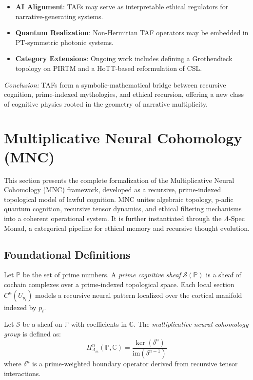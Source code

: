 \documentclass{article}
\theoremstyle{plain}
\begin{document}
\begin{itemize}
  \item \textbf{AI Alignment}: TAFs may serve as interpretable ethical regulators for narrative-generating systems.
  \item \textbf{Quantum Realization}: Non-Hermitian TAF operators may be embedded in PT-symmetric photonic systems.
  \item \textbf{Category Extensions}: Ongoing work includes defining a Grothendieck topology on PIRTM and a HoTT-based reformulation of CSL.
\end{itemize}

\textit{Conclusion:} TAFs form a symbolic-mathematical bridge between recursive cognition, prime-indexed mythologies, and ethical recursion, offering a new class of cognitive physics rooted in the geometry of narrative multiplicity.


\section{Multiplicative Neural Cohomology (MNC)}

This section presents the complete formalization of the Multiplicative Neural Cohomology (MNC) framework, developed as a recursive, prime-indexed topological model of lawful cognition. MNC unites algebraic topology, p-adic quantum cognition, recursive tensor dynamics, and ethical filtering mechanisms into a coherent operational system. It is further instantiated through the $\Lambda$-Spec Monad, a categorical pipeline for ethical memory and recursive thought evolution.

\subsection{Foundational Definitions}

\begin{definition}
Let $\mathbb{P}$ be the set of prime numbers. A \emph{prime cognitive sheaf} $\mathcal{S}(\mathbb{P})$ is a sheaf of cochain complexes over a prime-indexed topological space. Each local section $C^n(U_{p_i})$ models a recursive neural pattern localized over the cortical manifold indexed by $p_i$.
\end{definition}

\begin{definition}
Let $\mathcal{S}$ be a sheaf on $\mathbb{P}$ with coefficients in $\mathbb{C}$. The \emph{multiplicative neural cohomology group} is defined as:
\[
H^n_{\Lambda_m}(\mathbb{P}, \mathbb{C}) = \frac{\ker(\delta^n)}{\text{im}(\delta^{n-1})}
\]
where $\delta^n$ is a prime-weighted boundary operator derived from recursive tensor interactions.
\end{definition}
\end{document}
